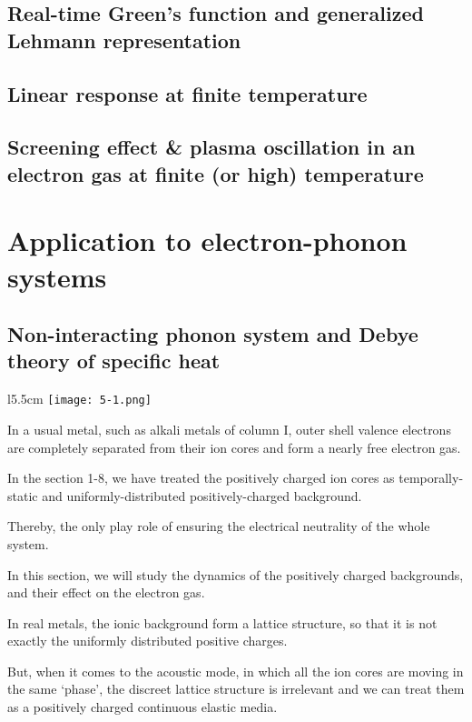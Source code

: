 ﻿\documentclass[twoside]{book}
\numberwithin{equation}{section}
\begin{document}
\section{Real-time Green's function and generalized Lehmann representation}
\section{Linear response at finite temperature}
\section{Screening effect \& plasma oscillation in an electron gas at finite (or high) temperature}


\chapter{Application to electron-phonon systems}

\section{Non-interacting phonon system and Debye theory of specific heat}

\begin{wrapfigure}{l}{5.5cm}%
\texttt{[image: 5-1.png]}
\end{wrapfigure}

In a usual metal, such as alkali metals of column I, outer shell valence electrons are completely separated from their ion cores and form a nearly free electron gas. 

In the section 1-8, we have treated the positively charged ion cores as temporally-static and uniformly-distributed positively-charged background. 

Thereby, the only play role of ensuring the electrical neutrality of the whole system. 

In this section, we will study the dynamics of the positively charged backgrounds, and their effect on the electron gas. 

In real metals, the ionic background form a lattice structure, so that it is not exactly the uniformly distributed positive charges. 

But, when it comes to the acoustic mode, in which all the ion cores are moving in the same `phase', the discreet lattice structure is irrelevant and we can treat them as a positively charged continuous elastic media. 
\end{document}
